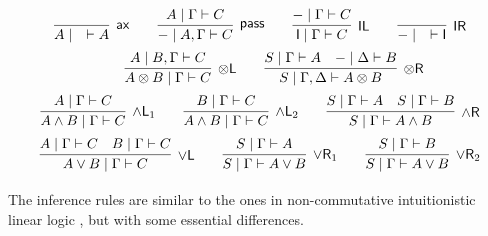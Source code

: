 \documentclass[submission,copyright,creativecommons]{eptcs}
\theoremstyle{definition}
\newcommand{\tl}{\otimes \mathsf{L}}
\newcommand{\tr}{\otimes \mathsf{R}}
\newcommand{\pass}{\mathsf{pass}}
\newcommand{\unitl}{\mathsf{IL}}
\newcommand{\unitr}{\mathsf{IR}}
\newcommand{\andlone}{\land \mathsf{L}_{1}}
\newcommand{\andltwo}{\land \mathsf{L}_{2}}
\newcommand{\andr}{\land \mathsf{R}}
\newcommand{\orl}{\lor \mathsf{L}}
\newcommand{\orrone}{\lor \mathsf{R}_{1}}
\newcommand{\orrtwo}{\lor \mathsf{R}_{2}}
\newcommand{\ax}{\mathsf{ax}}
\newcommand{\ot}{\otimes}
\newcommand{\I}{\mathsf{I}}
\newcommand{\NMILL}{$\mathtt{NMILL}$}
\begin{document}
\begin{equation}\label{eq:seqcalc}
  \def\arraystretch{2.5}
  \begin{array}{c}
    \infer[\ax]{A \mid \quad \vdash A}{}
    \qquad
    \infer[\pass]{{-} \mid A , \Gamma \vdash C}{A \mid \Gamma \vdash C}
    \qquad
    \infer[\unitl]{\I \mid \Gamma \vdash C}{{-} \mid \Gamma \vdash C}
    \qquad
    \infer[\unitr]{{-} \mid \quad \vdash \I}{}
    \\
    \qquad
    \infer[\tl]{A \ot B \mid \Gamma \vdash C}{A \mid B , \Gamma \vdash C}
    \qquad
    \infer[\tr]{S \mid \Gamma , \Delta \vdash A \ot B}{
      S \mid \Gamma \vdash A
      &
      {-} \mid \Delta \vdash B
    }
    \\
    \infer[\andlone]{A \land B \mid \Gamma \vdash C}{A \mid \Gamma \vdash C}
    \qquad
    \infer[\andltwo]{A \land B \mid \Gamma \vdash C}{B \mid \Gamma \vdash C}
    \qquad
    \infer[\andr]{S \mid \Gamma \vdash A \land B}{
      S \mid \Gamma \vdash A
      &
      S \mid \Gamma \vdash B
    }
    \\
    \infer[\orl]{A \lor B \mid \Gamma \vdash C}{
      A \mid \Gamma \vdash C
      &
      B \mid \Gamma \vdash C
    }
    \qquad
    \infer[\orrone]{S \mid \Gamma \vdash A \lor B}{S \mid \Gamma \vdash A}
    \qquad
    \infer[\orrtwo]{S \mid \Gamma \vdash A \lor B}{S \mid \Gamma \vdash B}
  \end{array}
\end{equation}
The inference rules are similar to the ones in non-commutative intuitionistic linear logic \cite{abrusci:noncommutative:1990}, but with some essential differences. 
\end{document}

